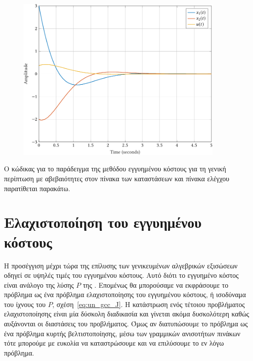 \begin{figure}[h]
    \centering
    \includegraphics[width=0.9\textwidth]{figures/gcc_quad_bound_gen3.pdf}
    \label{fig:gcc_quad_bound_gen3}
\end{figure}

Ο κώδικας για το παράδειγμα της μεθόδου εγγυημένου κόστους για τη γενική
περίπτωση με αβεβαιότητες στον πίνακα των καταστάσεων και πίνακα ελέγχου
παρατίθεται παρακάτω.
\eng{}

\section{Ελαχιστοποίηση του εγγυημένου κόστους}
Η προσέγγιση μέχρι τώρα της επίλυσης των γενικευμένων αλγεβρικών εξισώσεων
 οδηγεί σε υψηλές τιμές του εγγυημένου κόστους. Αυτό διότι το
εγγυημένο κόστος είναι ανάλογο της λύσης \( P \) της . Επομένως θα
μπορούσαμε να εκφράσουμε το πρόβλημα ως ένα πρόβλημα ελαχιστοποίησης του
εγγυημένου κόστους, ή ισοδύναμα του ίχνους του \( P \),
σχέση~\eqref{eq:un_gcc_J}. Η κατάστρωση ενός τέτοιου προβλήματος ελαχιστοποίησης
είναι μία δύσκολη διαδικασία και γίνεται ακόμα δυσκολότερη καθώς αυξάνονται οι
διαστάσεις του προβλήματος. Όμως αν διατυπώσουμε το πρόβλημα ως ένα πρόβλημα
κυρτής βελτιστοποίησης, μέσω των γραμμικών ανισοτήτων πινάκων
 τότε μπορούμε με ευκολία να καταστρώσουμε και να επιλύσουμε το εν λόγω
πρόβλημα.

